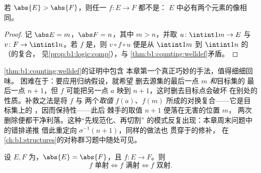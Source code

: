 \begin{corollary}[鸽巢原理]\label{cor:b1:counting:pigeonhole}
若 $\abs{E} > \abs{F}$，则任一 $f \colon E \to F$ 都不是：
$E$ 中必有两个元素的像相同。
\end{corollary}

\begin{proof}
记 $\abs E = m$，$\abs F = n$，其中 $m > n$，并取
$u \colon \intint1m \to E$ 与 $v \colon F \to \intint1n$。若 $f$
是，则 $v \circ f \circ u$ 便是从
$\intint1m$ 到 $\intint1n$ 的（的复合，
见\cref{prop:b1:logic:comp}），与
\cref{thm:b1:counting:welldef}矛盾。
\end{proof}

\begin{remark}[插曲：定理证明中为何要作交换？]\label{rem:b1:counting:swapinterlude}
\cref{thm:b1:counting:welldef}的证明中包含
本章第一个真正巧妙的手法，值得细细回味。
困难在于：要应用归纳假设，就希望
删去源集的最后一点 $m$ \emph{和}目标集的
最后一点 $n+1$，但 $f$ 可能把另一点 $a$ 映到 $n
+ 1$，这时删去目标点会破坏
在别处的性质。补救之法是将 $f$ 与
两个\emph{取值} $f(a)$、$f(m)$ 所成的对换复合——它是目标集上的
，因而保持性——此后
棘手的取值 $n + 1$ 便落在无害的位置 $m$，
两次删除便都干净利落。这种“先规范化、再切割”
的模式反复出现：本章周末问题中的错排递推
借此重定向 $\sigma^{-1}(n+1)$，同样的做法也
贯穿于的修补，
在\cref{ch:b1:structures}的对称群习题中随处可见。
\end{remark}

\begin{proposition}[单射、满射与基数]\label{prop:b1:counting:injsur}
设 $E, F$ 为，$\abs{E} = \abs{F}$，且 $f \colon E
\to F$。则
\[
f \text{ 单射} \iff f \text{ 满射} \iff f \text{ 双射}.
\]
\end{proposition}

